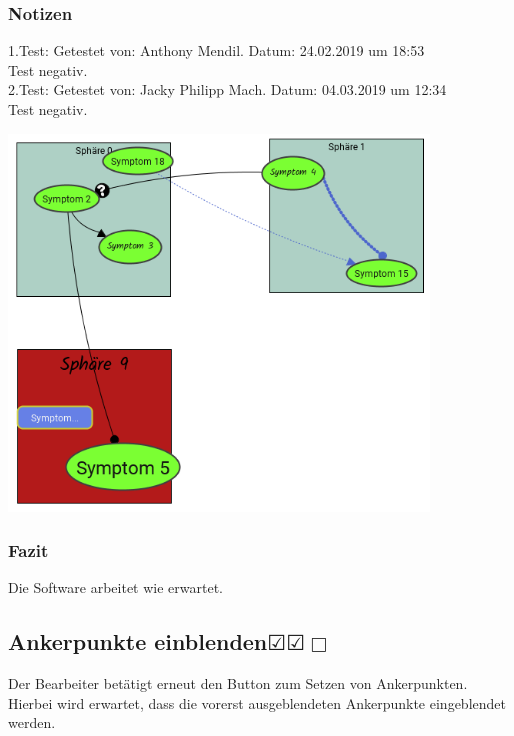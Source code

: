 \documentclass[enabledeprecatedfontcommands]{scrartcl}
\newcommand{\subsectiont}[2]{\subsection[#1]{#1{\normalsize\normalfont #2}}}
\newcommand{\leer}{$\Box$}
\newcommand{\ok}{$\CheckedBox$}
\begin{document}
\subsubsection{Notizen}
1.Test: Getestet von: Anthony Mendil. Datum: 24.02.2019 um 18:53 \\
Test negativ.\\
2.Test: Getestet von: Jacky Philipp Mach. Datum: 04.03.2019 um 12:34 \\
Test negativ.
\begin{center}
\includegraphics[height=10cm]{3_38.PNG}
\end{center}
\subsubsection{Fazit}
Die Software arbeitet wie erwartet.

\subsectiont{Ankerpunkte einblenden}{\dotfill\ok\ok\leer}
Der Bearbeiter betätigt erneut den Button zum Setzen von Ankerpunkten. Hierbei wird erwartet, dass die vorerst ausgeblendeten Ankerpunkte eingeblendet werden. 
\end{document}
